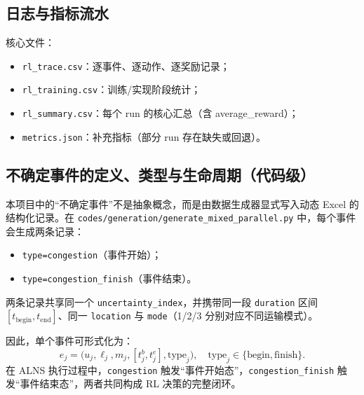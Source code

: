 ﻿\documentclass[11pt,a4paper]{ctexart}
\begin{document}
\subsection{日志与指标流水}
核心文件：
\begin{itemize}
  \item \texttt{rl\_trace.csv}：逐事件、逐动作、逐奖励记录；
  \item \texttt{rl\_training.csv}：训练/实现阶段统计；
  \item \texttt{rl\_summary.csv}：每个 run 的核心汇总（含 average\_reward）；
  \item \texttt{metrics.json}：补充指标（部分 run 存在缺失或回退）。
\end{itemize}

\subsection{不确定事件的定义、类型与生命周期（代码级）}
本项目中的“不确定事件”不是抽象概念，而是由数据生成器显式写入动态 Excel 的结构化记录。在
\texttt{codes/generation/generate\_mixed\_parallel.py} 中，每个事件会生成两条记录：
\begin{itemize}
  \item \texttt{type=congestion}（事件开始）；
  \item \texttt{type=congestion\_finish}（事件结束）。
\end{itemize}
两条记录共享同一个 \texttt{uncertainty\_index}，并携带同一段 \texttt{duration} 区间
\(
[t_{\text{begin}},t_{\text{end}}]
\)、同一
\texttt{location} 与 \texttt{mode}（1/2/3 分别对应不同运输模式）。

因此，单个事件可形式化为：
\begin{equation}
e_j=\big(u_j,\ell_j,m_j,[t_j^{b},t_j^{e}],\text{type}_j\big),\quad
\text{type}_j\in\{\text{begin},\text{finish}\}.
\end{equation}
在 ALNS 执行过程中，\texttt{congestion} 触发“事件开始态”，\texttt{congestion\_finish} 触发“事件结束态”，两者共同构成
RL 决策的完整闭环。
\end{document}
